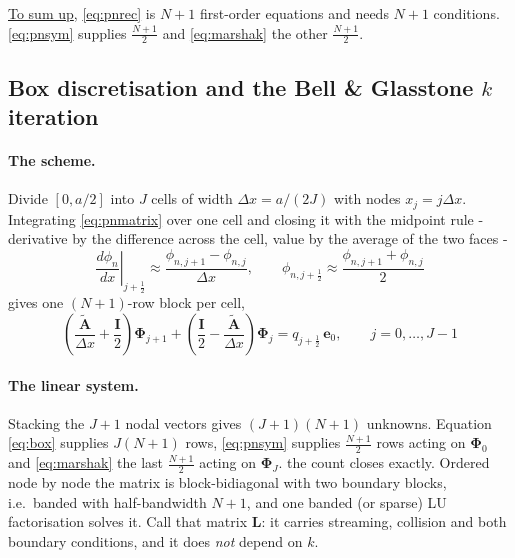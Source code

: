 \documentclass[11pt]{article}
\begin{document}
\uline{To sum up}, \eqref{eq:pnrec} is $N+1$ first-order equations and needs $N+1$ conditions.
\eqref{eq:pnsym} supplies $\tfrac{N+1}{2}$ and \eqref{eq:marshak} the other $\tfrac{N+1}{2}$.


\subsection*{Box discretisation and the Bell \& Glasstone $k$ iteration}

\paragraph{The scheme.} Divide $[0,a/2]$ into $J$ cells of width $\Delta x = a/(2J)$ with nodes
$x_j=j\Delta x$. Integrating \eqref{eq:pnmatrix} over one cell and closing it with the
midpoint rule - derivative by the difference across the cell, value by the average of the
two faces -
\begin{equation}
    \left.\frac{d\phi_n}{dx}\right|_{j+\frac12}\!\!\approx \frac{\phi_{n,j+1}-\phi_{n,j}}{\Delta x},
    \qquad
    \phi_{n,j+\frac12}\approx \frac{\phi_{n,j+1}+\phi_{n,j}}{2}
\end{equation}
gives one $(N+1)$-row block per cell,
\begin{equation}
    \left(\frac{\mathbf{\tilde A}}{\Delta x}+\frac{\mathbf{I}}{2}\right)\boldsymbol{\Phi}_{j+1}
    +\left(\frac{\mathbf{I}}{2}-\frac{\mathbf{\tilde A}}{\Delta x}\right)\boldsymbol{\Phi}_{j}
    = q_{j+\frac12}\,\mathbf{e}_0,
    \qquad j=0,\dots,J-1
    \label{eq:box}
\end{equation}

\paragraph{The linear system.} Stacking the $J+1$ nodal vectors gives $(J+1)(N+1)$ unknowns.
Equation \eqref{eq:box} supplies $J(N+1)$ rows, \eqref{eq:pnsym} supplies $\tfrac{N+1}{2}$ rows
acting on $\boldsymbol{\Phi}_0$ and \eqref{eq:marshak} the last $\tfrac{N+1}{2}$ acting on
$\boldsymbol{\Phi}_J$. the count closes exactly. Ordered node by node the matrix is
block-bidiagonal with two boundary blocks, i.e.\ banded with half-bandwidth $N+1$, and one
banded (or sparse) LU factorisation solves it. Call that matrix $\mathbf{L}$: it carries
streaming, collision and both boundary conditions, and it does \emph{not} depend on $k$.
\end{document}
